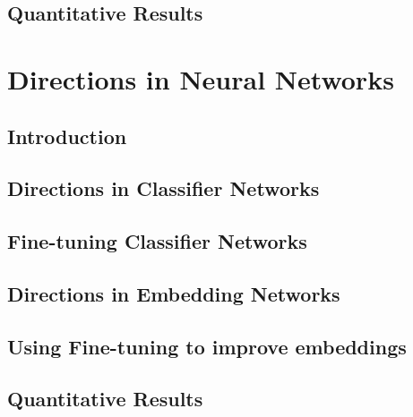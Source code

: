 \documentclass{article}
\begin{document}
 \subsection{Quantitative Results}
 
\section{Directions in Neural Networks}
\subsection{Introduction}
\subsection{Directions in Classifier Networks}
\subsection{Fine-tuning Classifier Networks}
\subsection{Directions in Embedding Networks}
\subsection{Using Fine-tuning to improve embeddings}
\subsection{Quantitative Results}
\end{document}
